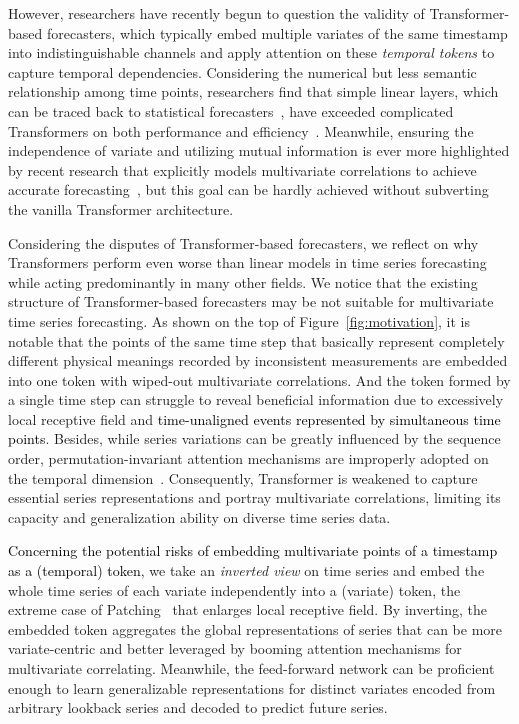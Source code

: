 \documentclass[twoside,12pt]{article}
\newcommand{\update}[1]{{\textcolor{black}{#1}}}
\begin{document}
However, researchers have recently begun to question the validity of Transformer-based forecasters, which typically embed multiple variates of the same timestamp into indistinguishable channels and apply attention on these \emph{temporal tokens} to capture temporal dependencies. Considering the numerical but less semantic relationship among time points, researchers find that simple linear layers, which can be traced back to statistical forecasters~\citep{box1968some}, have exceeded complicated Transformers on both performance and efficiency~\citep{DLinear, das2023long}. Meanwhile, ensuring the independence of variate and utilizing mutual information is ever more highlighted by recent research that explicitly models multivariate correlations to achieve accurate forecasting~\citep{Crossformer, TSMixer}, but this goal can be hardly achieved without subverting the vanilla Transformer architecture.


Considering the disputes of Transformer-based forecasters, we reflect on why Transformers perform even worse than linear models in time series forecasting while acting predominantly in many other fields. We notice that the existing structure of Transformer-based forecasters may be not suitable for multivariate time series forecasting. As shown on the top of Figure~\ref{fig:motivation}, it is notable that the points of the same time step that basically represent completely different physical meanings recorded by inconsistent measurements are embedded into one token with wiped-out multivariate correlations. And the token formed by a single time step can struggle to reveal beneficial information due to excessively local receptive field and \update{time-unaligned events represented by simultaneous time points}. Besides, while series variations can be greatly influenced by the sequence order, permutation-invariant attention mechanisms are improperly adopted on the temporal dimension~\citep{DLinear}. Consequently, Transformer is weakened to capture essential series representations and portray multivariate correlations, limiting its capacity and generalization ability on diverse time series data.


\update{Concerning the potential risks of embedding multivariate points of a timestamp as a (temporal) token}, we take an \emph{inverted view} on time series and embed the whole time series of each variate independently into a (variate) token, the extreme case of Patching~\citep{PatchTST} that enlarges local receptive field. By inverting, the embedded token aggregates the global representations of series that can be more variate-centric and better leveraged by booming attention mechanisms for multivariate correlating. Meanwhile, the feed-forward network can be proficient enough to learn generalizable representations for distinct variates encoded from arbitrary lookback series and decoded to predict future series.
\end{document}
